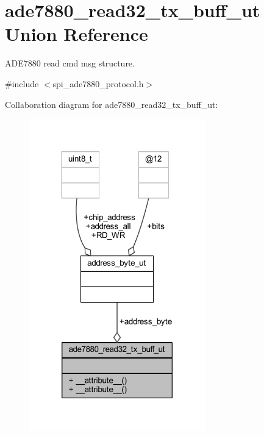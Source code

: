 \hypertarget{a00014}{\section{ade7880\-\_\-read32\-\_\-tx\-\_\-buff\-\_\-ut Union Reference}
\label{d2/de7/a00014}
}


A\-D\-E7880 read cmd msg structure.  




{\ttfamily \#include $<$spi\-\_\-ade7880\-\_\-protocol.\-h$>$}



Collaboration diagram for ade7880\-\_\-read32\-\_\-tx\-\_\-buff\-\_\-ut\-:\nopagebreak
\begin{figure}[H]
\begin{center}
\leavevmode
\includegraphics[width=216pt]{de/de1/a00065}
\end{center}
\end{figure}

